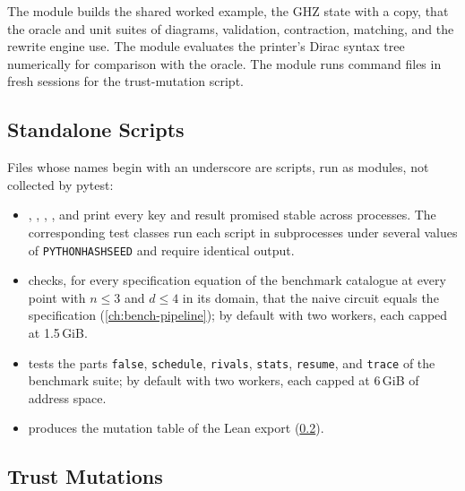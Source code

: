 The module  builds the shared worked example, the GHZ state with a copy, that the oracle and unit suites of diagrams, validation, contraction, matching, and the rewrite engine use. The module  evaluates the printer's Dirac syntax tree numerically for comparison with the oracle. The module  runs command files in fresh sessions for the trust-mutation script.

\subsection{Standalone Scripts}\label{sec:dev-scripts}

Files whose names begin with an underscore are scripts, run as modules, not collected by pytest:
\begin{itemize}
\item \begin{sloppypar}, , , , and  print every key and result promised stable across processes. The corresponding test classes run each script in subprocesses under several values of \texttt{PYTHONHASHSEED} and require identical output.\end{sloppypar}
\item {} checks, for every specification equation of the benchmark catalogue at every point with $n \le 3$ and $d \le 4$ in its domain, that the naive circuit equals the specification (\cref{ch:bench-pipeline}); by default with two workers, each capped at 1.5\,GiB.
\item {} tests the parts \texttt{false}, \texttt{schedule}, \texttt{rivals}, \texttt{stats}, \texttt{resume}, and \texttt{trace} of the benchmark suite; by default with two workers, each capped at 6\,GiB of address space.
\item {} produces the mutation table of the Lean export (\cref{sec:dev-mutations}).
\end{itemize}

\subsection{Trust Mutations}\label{sec:dev-mutations}

